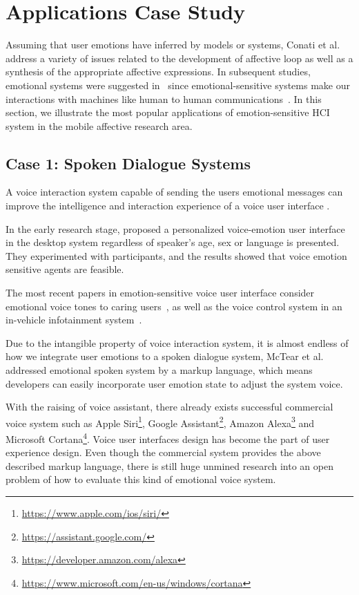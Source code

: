 \section{Applications Case Study}\label{sec:applications}

Assuming that user emotions have inferred by models or systems, Conati et al.~\cite{Conati2005} address a variety of issues related to the development of affective loop as well as a synthesis of the appropriate affective expressions. In subsequent studies, emotional systems were suggested in~\cite{Crane2007} since emotional-sensitive systems make our interactions with machines like human to human communications~\cite{picard1999affective}. In this section, we illustrate the most popular applications of emotion-sensitive HCI system in the mobile affective research area.

\subsection{Case 1: Spoken Dialogue Systems}

A voice interaction system capable of sending the users emotional messages can improve the intelligence and interaction experience of a voice user interface \cite{surace2001voice}.

In the early research stage, \cite{kostov2000emotion} proposed a personalized voice-emotion user interface in the desktop system regardless of speaker's age, sex or language is presented. They experimented with participants, and the results showed that voice emotion sensitive agents are feasible.

The most recent papers in emotion-sensitive voice user interface consider emotional voice tones to caring users~\cite{chang2016intelligent}, as well as the voice control system in an in-vehicle infotainment system~\cite{kim2016effects}.

Due to the intangible property of voice interaction system, it is almost endless of how we integrate user emotions to a spoken dialogue system, McTear et al.~\cite{mctear2016rise} addressed emotional spoken system by a markup language, which means developers can easily incorporate user emotion state to adjust the system voice. 

With the raising of voice assistant, there already exists successful commercial voice system such as Apple Siri\footnote{\url{https://www.apple.com/ios/siri/}}, Google Assistant\footnote{\url{https://assistant.google.com/}}, Amazon Alexa\footnote{\url{https://developer.amazon.com/alexa}} and Microsoft Cortana\footnote{\url{https://www.microsoft.com/en-us/windows/cortana}}. 
Voice user interfaces design has become the part of user experience design. Even though the commercial system provides the above described markup language, there is still huge unmined research into an open problem of how to evaluate this kind of emotional voice system.

